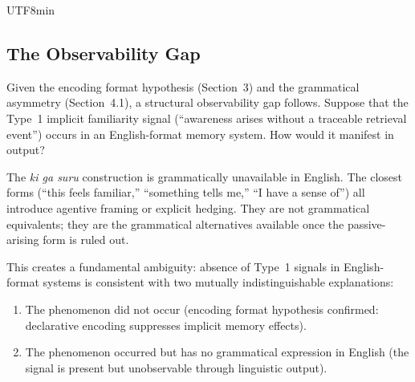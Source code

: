 \documentclass[12pt,a4paper]{article}
\begin{document}
\begin{CJK}{UTF8}{min}
\subsection{The Observability Gap}

Given the encoding format hypothesis (Section~3) and the grammatical asymmetry
(Section~4.1), a structural observability gap follows. Suppose that the Type~1
implicit familiarity signal (``awareness arises without a traceable retrieval
event'') occurs in an English-format memory system. How would it manifest in
output?

The \emph{ki ga suru} construction is grammatically unavailable in English. The
closest forms (``this feels familiar,'' ``something tells me,'' ``I have a
sense of'') all introduce agentive framing or explicit hedging. They are not
grammatical equivalents; they are the grammatical alternatives available once
the passive-arising form is ruled out.

This creates a fundamental ambiguity: absence of Type~1 signals in
English-format systems is consistent with two mutually indistinguishable
explanations:

\begin{enumerate}
\item The phenomenon did not occur (encoding format hypothesis confirmed:
  declarative encoding suppresses implicit memory effects).
\item The phenomenon occurred but has no grammatical expression in English (the
  signal is present but unobservable through linguistic output).
\end{enumerate}


\end{CJK}
\end{document}
